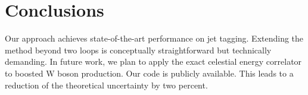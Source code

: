 \section{Conclusions}\label{sec:conclusions}

Our approach achieves state-of-the-art performance on jet tagging.
Extending the method beyond two loops is conceptually straightforward
but technically demanding. In future work, we plan to apply the exact
celestial energy correlator to boosted W boson production. Our code is
publicly available. This leads to a reduction of the theoretical
uncertainty by two percent.

